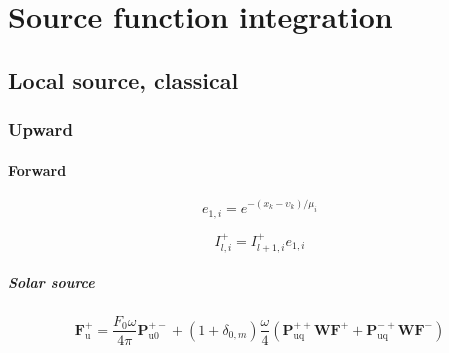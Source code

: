 %
\section{Source function integration}
\label{sec:source_function_integration}


%
\subsection{Local source, classical}
\label{sec:source_function_integration-local_source_classical}


%
\subsubsection{Upward}
\label{sec:source_function_integration-local_source_classical-upward}


%
\paragraph{Forward}
\label{sec:source_function_integration-local_source_classical-upward-forward}

\begin{equation}
e_{1,i} = e^{-(x_{k} - \upsilon_{k}) / \mu_{i}}
\label{eq:source_function_integration-local_source_classical-upward-forward-e_1_i}
\end{equation}

\begin{equation}
I^{+}_{l,i} = I^{+}_{l+1,i} e_{1,i}
\label{eq:source_function_integration-local_source_classical-upward-forward-I_p_l_i_1}
\end{equation}


\subparagraph{Solar source}
\label{sec:source_function_integration-local_source_classical-upward-forward-solar_source}

\begin{equation}
\mathbf{F}^{+}_{\mathrm{u}} = \frac{F_{0}\omega}{4\pi}\mathbf{P}^{+-}_{\mathrm{u0}} + (1 + \delta_{0,m}) \frac{\omega}{4}(\mathbf{P}^{++}_{\mathrm{uq}}\mathbf{W}\mathbf{F}^{+} + \mathbf{P}^{-+}_{\mathrm{uq}}\mathbf{W}\mathbf{F}^{-})
\label{eq:source_function_integration-local_source_classical-upward-forward-solar_source-F_p_u}
\end{equation}

